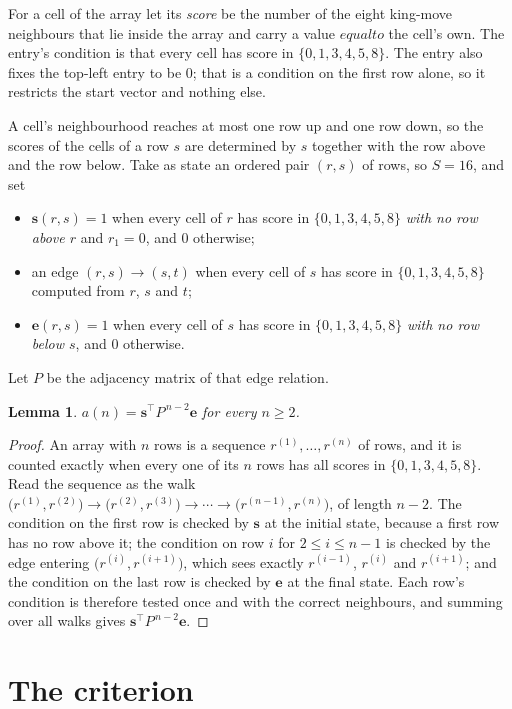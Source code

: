 \documentclass[11pt,a4paper]{article}
\theoremstyle{plain}
\newtheorem{lemma}[theorem]{Lemma}
\theoremstyle{definition}
\begin{document}
For a cell of the array let its \emph{score} be the number of the eight king-move neighbours that lie inside
the array and carry a value $equal to$ the cell's own. The entry's condition is that every cell
has score in $\{0,1,3,4,5,8\}$. The entry also fixes the top-left entry to be $0$; that is a condition on the first row alone, so it restricts the start vector and nothing else.

A cell's neighbourhood reaches at most one row up and one row down, so the scores of the
cells of a row $s$ are determined by $s$ together with the row above and the row below.
Take as state an ordered pair $(r,s)$ of rows, so $S=16$, and set
\begin{itemize}
\item $\mathbf{s}(r,s)=1$ when every cell of $r$ has score in $\{0,1,3,4,5,8\}$ \emph{with no row
above $r$} and $r_1=0$, and $0$ otherwise;
\item an edge $(r,s)\to(s,t)$ when every cell of $s$ has score in $\{0,1,3,4,5,8\}$ computed from
$r$, $s$ and $t$;
\item $\mathbf{e}(r,s)=1$ when every cell of $s$ has score in $\{0,1,3,4,5,8\}$ \emph{with no row
below $s$}, and $0$ otherwise.
\end{itemize}
Let $P$ be the adjacency matrix of that edge relation.

\begin{lemma}\label{lem:walk}
$a(n)=\mathbf{s}^{\!\top}P^{\,n-2}\mathbf{e}$ for every $n\ge2$.
\end{lemma}

\begin{proof}
An array with $n$ rows is a sequence $r^{(1)},\dots,r^{(n)}$ of rows, and it is counted
exactly when every one of its $n$ rows has all scores in $\{0,1,3,4,5,8\}$. Read the sequence as the
walk $\bigl(r^{(1)},r^{(2)}\bigr)\to\bigl(r^{(2)},r^{(3)}\bigr)\to\cdots\to
\bigl(r^{(n-1)},r^{(n)}\bigr)$, of length $n-2$. The condition on the first row is
checked by $\mathbf{s}$ at the initial state, because a first row has no row above it; the
condition on row $i$ for $2\le i\le n-1$ is checked by the edge entering
$\bigl(r^{(i)},r^{(i+1)}\bigr)$, which sees exactly $r^{(i-1)}$, $r^{(i)}$ and
$r^{(i+1)}$; and the condition on the last row is checked by $\mathbf{e}$ at the final
state. Each row's condition is therefore tested once and with the correct neighbours, and
summing over all walks gives $\mathbf{s}^{\!\top}P^{\,n-2}\mathbf{e}$.
\end{proof}

\section{The criterion}
\end{document}
